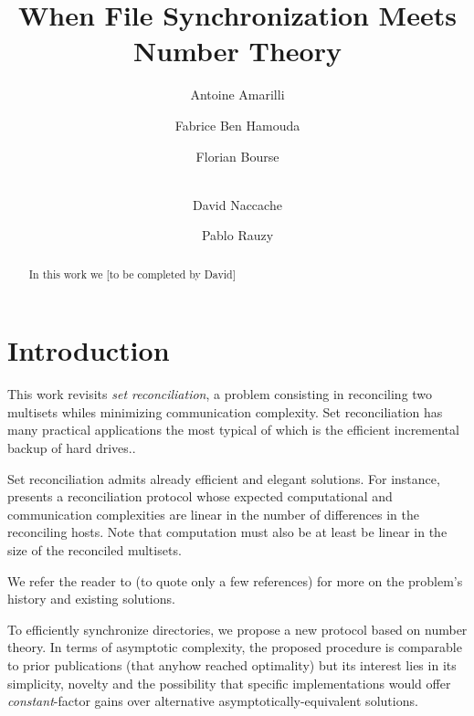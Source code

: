 \documentclass[11pt]{llncs}
\begin{document}
\title{When File Synchronization Meets Number Theory}

\author{Antoine Amarilli \and Fabrice Ben Hamouda \and Florian Bourse \and\\
David Naccache \and Pablo Rauzy}


\maketitle

\begin{abstract}

In this work we [to be completed by David]

\end{abstract}

\section{Introduction}

This work revisits {\sl set reconciliation}, a problem consisting in reconciling two multisets whiles minimizing communication complexity. Set reconciliation has many practical applications the most typical of which is the efficient incremental backup of hard drives.\smallskip.

Set reconciliation admits already efficient and elegant solutions. For instance, \cite{PSRec} presents a reconciliation protocol whose expected computational and communication complexities are linear in the number of differences in the reconciling hosts. Note that computation must also be at least be linear in the size of the reconciled multisets.\smallskip

We refer the reader to \cite{PSRec,Mins1,Whats} (to quote only a few references) for more on the problem's history and existing solutions.\smallskip

To efficiently synchronize directories, we propose a new protocol based on number theory. In terms of asymptotic complexity, the proposed procedure is comparable to prior publications \cite{PSRec} (that anyhow reached optimality) but its interest lies in its simplicity, novelty and the possibility that specific implementations would offer {\sl constant}-factor gains over alternative asymptotically-equivalent solutions.\smallskip
\end{document}
